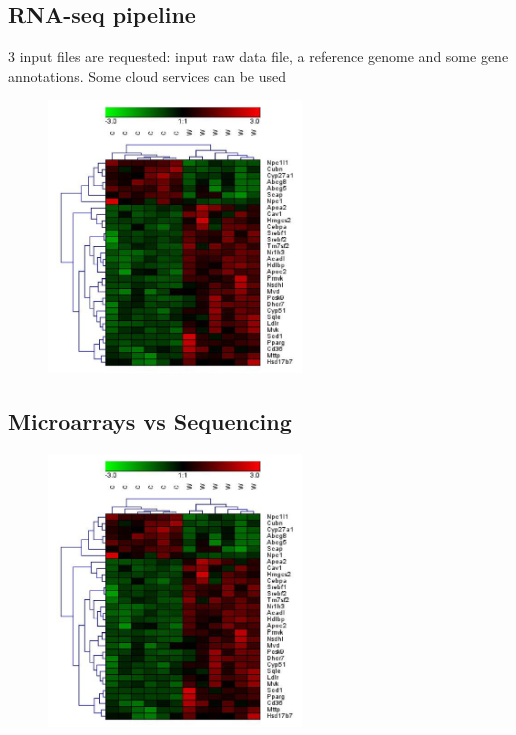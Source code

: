 \subsection{RNA-seq pipeline}
3 input files are requested: input raw data file, a reference genome and some gene annotations. Some cloud services can be used

\begin{figure}[h]
\caption{}
\centering
\includegraphics[width=0.6\textwidth]{MicroRNAresults}
\end{figure}

\subsection{Microarrays vs Sequencing}

\begin{figure}[h]
\caption{}
\centering
\includegraphics[width=0.6\textwidth]{MicroRNAresults}
\end{figure}


